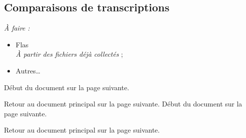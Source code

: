 \documentclass{report}
\begin{document}
\subsection{Comparaisons de transcriptions}
\textit{À faire :}
\begin{itemize}
	\item Flas\\\textit{À partir des fichiers déjà collectés} ;
	\item Autres…\\
\end{itemize}
Début du document sur la page suivante.\newpage

Retour au document principal sur la page suivante.\newpage
Début du document sur la page suivante.\newpage

Retour au document principal sur la page suivante.\newpage
\end{document}
